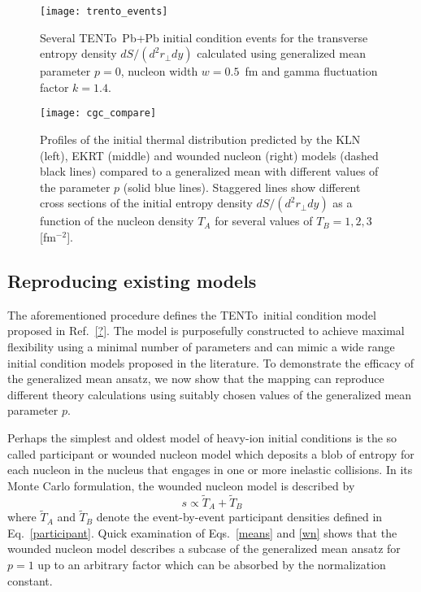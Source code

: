 \documentclass[aps,prc,reprint,amsmath,nofootinbib]{revtex4-1}
\newcommand{\trento}{T\raisebox{-0.5ex}{R}ENTo}
\newcommand{\T}{\tilde{T}}
\begin{document}
\begin{figure}
    \texttt{[image: trento\_events]}
    \caption{Several \protect\trento\ Pb+Pb initial condition events for the transverse entropy density $dS/(d^2r_\perp dy)$ calculated using generalized mean parameter $p=0$, nucleon width $w=0.5$~fm and gamma fluctuation factor $k=1.4$.}
    \label{fig:trento_events}
\end{figure}

\begin{figure*}
    \texttt{[image: cgc\_compare]}
    \caption{Profiles of the initial thermal distribution predicted by the KLN (left), EKRT (middle) and wounded nucleon (right) models (dashed black lines) compared to a generalized mean with different values of the parameter $p$ (solid blue lines).
    Staggered lines show different cross sections of the initial entropy density $dS/(d^2r_\perp dy)$ as a function of the nucleon density $T_A$ for several values of $T_B = 1, 2, 3$ [fm$^{-2}$].} 
\end{figure*}


\subsection{Reproducing existing models}

The aforementioned procedure defines the \trento\ initial condition model proposed in Ref.~\ref{?}. The model is purposefully constructed to achieve maximal flexibility using a minimal number of parameters and can mimic a wide range initial condition models proposed in the literature. To demonstrate the efficacy of the generalized mean ansatz, we now show that the mapping can reproduce different theory calculations using suitably chosen values of the generalized mean parameter $p$.

Perhaps the simplest and oldest model of heavy-ion initial conditions is the so called participant or wounded nucleon model which deposits a blob of entropy for each nucleon in the nucleus that engages in one or more inelastic collisions. In its Monte Carlo formulation, the wounded nucleon model is described by
\begin{equation}
    \label{wn}
    s \propto \T_A + \T_B
\end{equation}
where $\T_A$ and $\T_B$ denote the event-by-event participant densities defined in Eq.~\eqref{participant}. Quick examination of Eqs.~\eqref{means} and \eqref{wn} shows that the wounded nucleon model describes a subcase of the generalized mean ansatz for $p=1$ up to an arbitrary factor which can be absorbed by the normalization constant.
\end{document}
